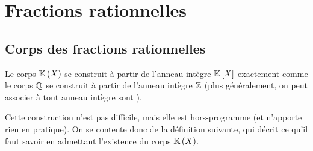 \section{Fractions rationnelles}

\subsection{Corps des fractions rationnelles}

Le corps \(\fracrat\) se construit à partir de l'anneau intègre \(\poly\) exactement comme le corps \(\mathbb{Q}\) se construit à partir de l'anneau intègre \(\mathbb{Z}\) (plus généralement, on peut associer à tout anneau intègre sont ).

Cette construction n'est pas difficile, mais elle est hors-programme (et n'apporte rien en pratique). On se contente donc de la définition suivante, qui décrit ce qu'il faut savoir en admettant l'existence du corps \(\fracrat\).


